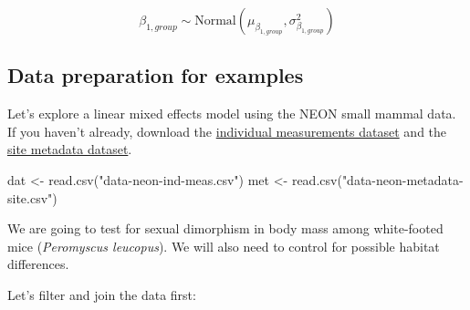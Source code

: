 \documentclass[
  13,
  letterpaper,
]{report}
\newenvironment{Shaded}{\begin{snugshade}}{\end{snugshade}}
\newcommand{\FunctionTok}[1]{\textcolor[rgb]{0.28,0.35,0.67}{#1}}
\newcommand{\NormalTok}[1]{\textcolor[rgb]{0.00,0.23,0.31}{#1}}
\newcommand{\OtherTok}[1]{\textcolor[rgb]{0.00,0.23,0.31}{#1}}
\newcommand{\StringTok}[1]{\textcolor[rgb]{0.13,0.47,0.30}{#1}}
\begin{document}
\[\beta_{1,group}\sim\text{Normal}\left(\mu_{\beta_{1,group}},\sigma^2_{\beta_{1,group}}\right)\]

\subsection{Data preparation for examples}\label{sec-mixed-lmm-data}

Let's explore a linear mixed effects model using the NEON small mammal
data. If you haven't already, download the
\href{../datasets/data-neon-ind-meas.csv}{individual measurements
dataset} and the \href{../datasets/data-neon-metadata-site.csv}{site
metadata dataset}.

\begin{Shaded}
\begin{Highlighting}[]
\NormalTok{dat }\OtherTok{\textless{}{-}} \FunctionTok{read.csv}\NormalTok{(}\StringTok{"data{-}neon{-}ind{-}meas.csv"}\NormalTok{)}
\NormalTok{met }\OtherTok{\textless{}{-}} \FunctionTok{read.csv}\NormalTok{(}\StringTok{"data{-}neon{-}metadata{-}site.csv"}\NormalTok{)}
\end{Highlighting}
\end{Shaded}

We are going to test for sexual dimorphism in body mass among
white-footed mice (\emph{Peromyscus leucopus}). We will also need to
control for possible habitat differences.

Let's filter and join the data first:
\end{document}
